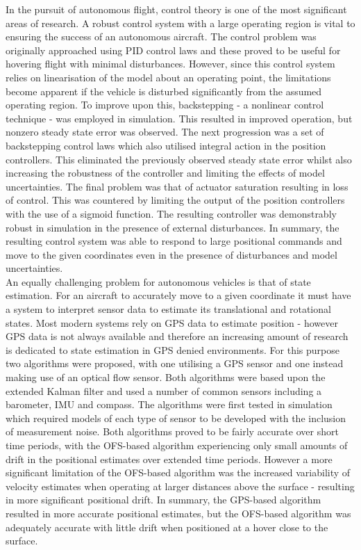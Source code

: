 In the pursuit of autonomous flight, control theory is one of the most significant areas of research. A robust control system with a large operating region is vital to ensuring the success of an autonomous aircraft. The control problem was originally approached using PID control laws and these proved to be useful for hovering flight with minimal disturbances. However, since this control system relies on linearisation of the model about an operating point, the limitations become apparent if the vehicle is disturbed significantly from the assumed operating region. To improve upon this, backstepping - a nonlinear control technique - was employed in simulation. This resulted in improved operation, but nonzero steady state error was observed. The next progression was a set of backstepping control laws which also utilised integral action in the position controllers. This eliminated the previously observed steady state error whilst also increasing the robustness of the controller and limiting the effects of model uncertainties. The final problem was that of actuator saturation resulting in loss of control. This was countered by limiting the output of the position controllers with the use of a sigmoid function. The resulting controller was demonstrably robust in simulation in the presence of external disturbances. In summary, the resulting control system was able to respond to large positional commands and move to the given coordinates even in the presence of disturbances and model uncertainties.\\

An equally challenging problem for autonomous vehicles is that of state estimation. For an aircraft to accurately move to a given coordinate it must have a system to interpret sensor data to estimate its translational and rotational states. Most modern systems rely on GPS data to estimate position - however GPS data is not always available and therefore an increasing amount of research is dedicated to state estimation in GPS denied environments. For this purpose two algorithms were proposed, with one utilising a GPS sensor and one instead making use of an optical flow sensor. Both algorithms were based upon the extended Kalman filter and used a number of common sensors including a barometer, IMU and compass. The algorithms were first tested in simulation which required models of each type of sensor to be developed with the inclusion of measurement noise. Both algorithms proved to be fairly accurate over short time periods, with the OFS-based algorithm experiencing only small amounts of drift in the positional estimates over extended time periods. However a more significant limitation of the OFS-based algorithm was the increased variability of velocity estimates when operating at larger distances above the surface - resulting in more significant positional drift. In summary, the GPS-based algorithm resulted in more accurate positional estimates, but the OFS-based algorithm was adequately accurate with little drift when positioned at a hover close to the surface.\\

